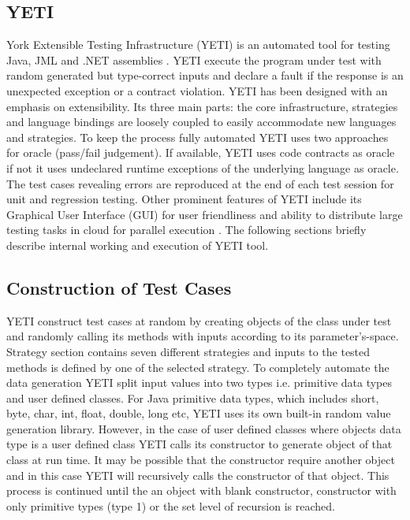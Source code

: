 \subsection{YETI}
York Extensible Testing Infrastructure (YETI) is an automated tool for testing Java, JML and .NET assemblies \cite{Oriol2010c}. YETI execute the program under test with random generated but type-correct inputs and declare a fault if the response is an unexpected exception or a contract violation. YETI has been designed with an emphasis on extensibility. Its three main parts: the core infrastructure, strategies and language bindings are loosely coupled to easily accommodate new languages and strategies. To keep the process fully automated YETI uses two approaches for oracle (pass/fail judgement). If available, YETI uses code contracts as oracle if not it uses undeclared runtime exceptions of the underlying language as oracle. The test cases revealing errors are reproduced at the end of each test session for unit and regression testing. Other prominent features of YETI include its Graphical User Interface (GUI) for user friendliness and ability to distribute large testing tasks in cloud for parallel execution \cite{Oriol2010}. The following sections briefly describe internal working and execution of YETI tool. 

\subsection{Construction of Test Cases}
YETI construct test cases at random by creating objects of the class under test and randomly calling its methods with inputs according to its parameter's-space. Strategy section contains seven different strategies and inputs to the tested methods is defined by one of the selected strategy. To completely automate the data generation YETI   split input values into two types i.e. primitive data types and user defined classes. For Java primitive data types, which includes short, byte, char, int, float, double, long etc, YETI uses its own built-in random value generation library. However, in the case of user defined classes where objects data type is a user defined class YETI calls its constructor to generate object of that class at run time. It may be possible that the constructor require another object and in this case YETI will recursively calls the constructor of that object. This process is continued until the an object with blank constructor, constructor with only primitive types (type 1) or the set level of recursion is reached. 

